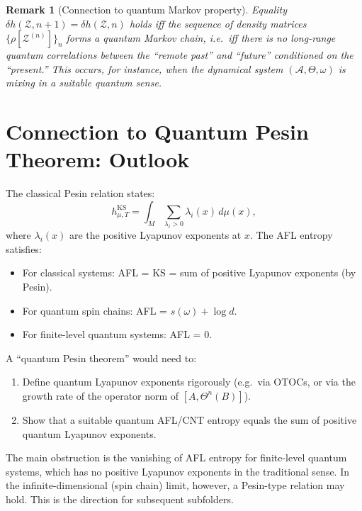 \documentclass[12pt,a4paper]{article}
\newtheorem{remark}[theorem]{Remark}
\newcommand{\A}{\mathcal{A}}
\begin{document}
\begin{remark}[Connection to quantum Markov property]
Equality $\delta h(\mathcal{Z},n+1)=\delta h(\mathcal{Z},n)$ holds iff the
sequence of density matrices $\{\rho[\mathcal{Z}^{(n)}]\}_n$ forms a
\emph{quantum Markov chain}, i.e.\ iff there is no long-range quantum
correlations between the ``remote past'' and ``future'' conditioned on the
``present.''  This occurs, for instance, when the dynamical system
$(\A,\Theta,\omega)$ is mixing in a suitable quantum sense.
\end{remark}

\section{Connection to Quantum Pesin Theorem: Outlook}

The classical Pesin relation states:
\[
  h_{\mu,T}^{\mathrm{KS}} = \int_M \sum_{\lambda_i>0}\lambda_i(x)\,d\mu(x),
\]
where $\lambda_i(x)$ are the positive Lyapunov exponents at $x$.  The
AFL entropy satisfies:

\begin{itemize}
  \item For classical systems: AFL = KS = sum of positive Lyapunov exponents
        (by Pesin).
  \item For quantum spin chains: AFL = $s(\omega)+\log d$.
  \item For finite-level quantum systems: AFL = 0.
\end{itemize}

A ``quantum Pesin theorem'' would need to:
\begin{enumerate}
  \item Define quantum Lyapunov exponents rigorously (e.g.\ via OTOCs, or via
        the growth rate of the operator norm of $[A,\Theta^n(B)]$).
  \item Show that a suitable quantum AFL/CNT entropy equals the sum of positive
        quantum Lyapunov exponents.
\end{enumerate}

The main obstruction is the vanishing of AFL entropy for finite-level quantum
systems, which has no positive Lyapunov exponents in the traditional sense.
In the infinite-dimensional (spin chain) limit, however, a Pesin-type relation
may hold.  This is the direction for subsequent subfolders.
\end{document}
